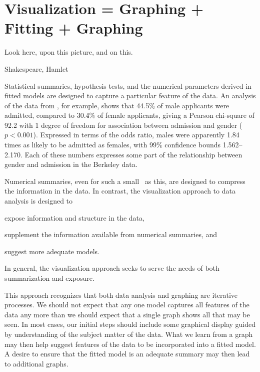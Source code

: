 \section{Visualization = Graphing + Fitting + Graphing}\label{sec:intro-visualize}
\epigraph{Look here, upon this picture, and on this.}{Shakespeare, Hamlet}

Statistical summaries, hypothesis tests, and the numerical parameters
derived in fitted models are designed to capture a particular feature of the
data.  An analysis of the data from , for example,
shows that 44.5\% of male applicants were admitted, compared to
30.4\% of female applicants, giving a Pearson chi-square of 92.2
with 1 degree of freedom
for association between admission and gender ($p < 0.001$).
Expressed in terms of the odds ratio, males were apparently
1.84 times as likely
to be admitted as females, with 99\% confidence bounds
1.562--2.170.
Each of these numbers expresses some part of the relationship between
gender and admission in the Berkeley data.

Numerical summaries, even for such a small \Dset\ as this,
are designed to compress the information in the data.
In contrast, the visualization approach to data analysis is designed
to 
\begin{seriate}
\item expose information and structure in the data,
\item supplement the information available from numerical summaries, and 
\item suggest more adequate models.
\end{seriate}
In general, the visualization approach seeks to serve the needs of
both summarization and exposure.

This approach recognizes that both data analysis and graphing are
iterative processes.
We should not expect that any one model captures all features of the
data any more than we should expect that a single graph shows all that
may be seen.  In most cases, our initial steps should include some
graphical display guided by understanding of the subject matter
of the data.
What we learn from a graph may then help suggest features of the data
to be incorporated into a fitted model.
A desire to ensure that the fitted model is an adequate summary
may then lead to additional graphs.

